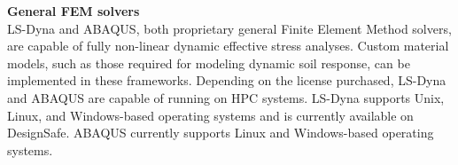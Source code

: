 \noindent\textbf{General FEM solvers}\\
LS-Dyna and ABAQUS, both proprietary general Finite Element Method solvers, are capable of fully non-linear dynamic effective stress analyses. Custom material models, such as those required for modeling dynamic soil response, can be implemented in these frameworks. Depending on the license purchased, LS-Dyna and ABAQUS are capable of running on HPC systems. LS-Dyna supports Unix, Linux, and Windows-based operating systems and is currently available on DesignSafe. ABAQUS currently supports Linux and Windows-based operating systems.\\





%
